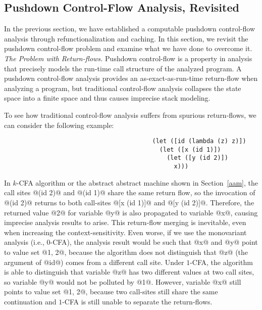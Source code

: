 \documentclass[acmsmall, review]{acmart}\settopmatter{}
\begin{document}
\subsection{Pushdown Control-Flow Analysis, Revisited} \label{pdcfarevisit}

In the previous section, we have established a computable pushdown control-flow
analysis through refunctionalization and caching. In this section, we revisit 
the pushdown control-flow problem and examine what we have done to overcome it. \\

\textit{The Problem with Return-flows.}
Pushdown control-flow is a property in analysis that precisely models the run-time
call structure of the analyzed program. A pushdown control-flow analysis provides an 
as-exact-as-run-time return-flow when analyzing a program, but traditional 
control-flow analysis collapses the state space into a finite space and thus 
causes imprecise stack modeling.

To see how traditional control-flow analysis suffers from spurious return-flows,
we can consider the following example:

\begin{lstlisting}
                                         (let ([id (lambda (z) z)])
                                           (let ([x (id 1)])
                                             (let ([y (id 2)])
                                               x)))
\end{lstlisting}

In $k$-CFA algorithm or the abstract abstract machine shown in Section~\ref{aam},
the call sites @(id 2)@ and @(id 1)@ share the same return flow, so the invocation
of @(id 2)@ returns to both call-sites @[x (id 1)]@ and @[y (id 2)]@.  Therefore,
the returned value @2@ for variable @y@ is also propagated to variable @x@, causing
imprecise analysis results to arise. This return-flow merging is inevitable, even when
increasing the context-sensitivity. Even worse, if we use the monovariant analysis (i.e.,
$0$-CFA), the analysis result would be such that @x@ and @y@ point to value set @{1, 2}@,
because the algorithm does not distinguish that @z@ (the argument of @id@) comes from a
different call site. Under $1$-CFA, the algorithm is able to distinguish that variable
@z@ has two different values at two call sites, so variable @y@ would not be polluted by
@1@. However, variable @x@ still points to value set @{1, 2}@, because two call-sites still
share the same continuation and $1$-CFA is still unable to separate the return-flows. \\
\end{document}
